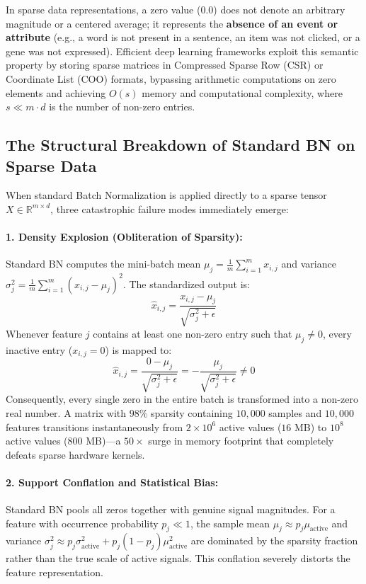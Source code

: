 \documentclass[twocolumn,10pt]{article}
\begin{document}
In sparse data representations, a zero value ($0.0$) does not denote an arbitrary magnitude or a centered average; it represents the \textbf{absence of an event or attribute} (e.g., a word is not present in a sentence, an item was not clicked, or a gene was not expressed). Efficient deep learning frameworks exploit this semantic property by storing sparse matrices in Compressed Sparse Row (CSR) or Coordinate List (COO) formats, bypassing arithmetic computations on zero elements and achieving $O(s)$ memory and computational complexity, where $s \ll m \cdot d$ is the number of non-zero entries.

\subsection{The Structural Breakdown of Standard BN on Sparse Data}

When standard Batch Normalization is applied directly to a sparse tensor $X \in \mathbb{R}^{m \times d}$, three catastrophic failure modes immediately emerge:

\paragraph{1. Density Explosion (Obliteration of Sparsity):}
Standard BN computes the mini-batch mean $\mu_j = \frac{1}{m}\sum_{i=1}^m x_{i,j}$ and variance $\sigma_j^2 = \frac{1}{m}\sum_{i=1}^m (x_{i,j} - \mu_j)^2$. The standardized output is:
\begin{equation}
\hat{x}_{i,j} = \frac{x_{i,j} - \mu_j}{\sqrt{\sigma_j^2 + \epsilon}}
\end{equation}
Whenever feature $j$ contains at least one non-zero entry such that $\mu_j \neq 0$, every inactive entry ($x_{i,j} = 0$) is mapped to:
\begin{equation}
\hat{x}_{i,j} = \frac{0 - \mu_j}{\sqrt{\sigma_j^2 + \epsilon}} = -\frac{\mu_j}{\sqrt{\sigma_j^2 + \epsilon}} \neq 0
\end{equation}
Consequently, every single zero in the entire batch is transformed into a non-zero real number. A matrix with $98\%$ sparsity containing $10,000$ samples and $10,000$ features transitions instantaneously from $2 \times 10^6$ active values ($16$ MB) to $10^8$ active values ($800$ MB)---a $50\times$ surge in memory footprint that completely defeats sparse hardware kernels.

\paragraph{2. Support Conflation and Statistical Bias:}
Standard BN pools all zeros together with genuine signal magnitudes. For a feature with occurrence probability $p_j \ll 1$, the sample mean $\mu_j \approx p_j \mu_{\text{active}}$ and variance $\sigma_j^2 \approx p_j \sigma_{\text{active}}^2 + p_j(1-p_j)\mu_{\text{active}}^2$ are dominated by the sparsity fraction rather than the true scale of active signals. This conflation severely distorts the feature representation.
\end{document}
